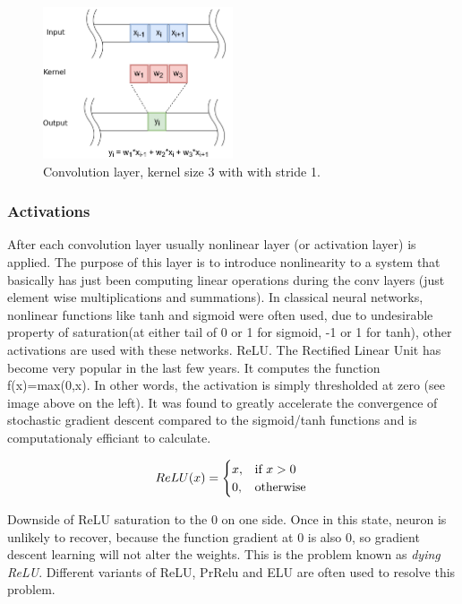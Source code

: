 \documentclass[times, utf8, diplomski, numeric, english]{fer}
\begin{document}
\begin{figure}[!ht]
	\begin{center}
		\includegraphics[width=0.5\textwidth]{./imgs/convolution.png}
		\caption{Convolution layer, kernel size 3 with with stride 1.}
		\label{fg:convolution}
	\end{center}
\end{figure}


\subsubsection{Activations}
 After each convolution layer usually nonlinear layer (or activation layer) is applied. The purpose of this layer is to introduce nonlinearity to a system that basically has just been computing linear operations during the conv layers (just element wise multiplications and summations). In classical neural networks, nonlinear functions like tanh and sigmoid were often used, due to undesirable property of saturation(at either tail of 0 or 1 for sigmoid, -1 or 1 for tanh), other activations are used with these networks. 
ReLU. The Rectified Linear Unit has become very popular in the last few years. It computes the function f(x)=max(0,x). In other words, the activation is simply thresholded at zero (see image above on the left).
 It was found to greatly accelerate the convergence of stochastic gradient descent compared to the sigmoid/tanh functions \cite{NIPS2012_4824} and is computationaly efficiant to calculate.

\begin{equation}
ReLU(x) =
	\begin{cases}
		x, & \text{if}\ x>0 \\
		0, & \text{otherwise}
	\end{cases} \\
\end{equation}


Downside of ReLU saturation to the 0 on one side. Once in this state, neuron is unlikely to recover, because the function gradient at 0 is also 0, so gradient descent learning will not alter the weights. This is the problem known as \textit{dying ReLU}.
Different variants of ReLU, PrRelu and ELU are often used to resolve this problem\cite{prelu}\cite{elu}.  
\end{document}
